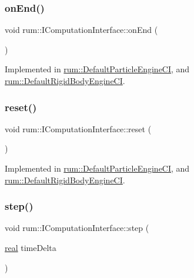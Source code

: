 \subsubsection{\texorpdfstring{on\+End()}{onEnd()}}
{\footnotesize\ttfamily void rum\+::\+I\+Computation\+Interface\+::on\+End (\begin{DoxyParamCaption}{ }\end{DoxyParamCaption})\hspace{0.3cm}{\ttfamily [pure virtual]}}



Implemented in \mbox{\hyperlink{classrum_1_1_default_particle_engine_c_i_ae478e3b581c3a6b306219c19552ff282}{rum\+::\+Default\+Particle\+Engine\+CI}}, and \mbox{\hyperlink{classrum_1_1_default_rigid_body_engine_c_i_aa1bc991031aab98d598f69c61fd3bc4c}{rum\+::\+Default\+Rigid\+Body\+Engine\+CI}}.

\mbox{\label{classrum_1_1_i_computation_interface_a9cff2ff492abd2a4f014aa4f25184c8b}} 
\subsubsection{\texorpdfstring{reset()}{reset()}}
{\footnotesize\ttfamily void rum\+::\+I\+Computation\+Interface\+::reset (\begin{DoxyParamCaption}{ }\end{DoxyParamCaption})\hspace{0.3cm}{\ttfamily [pure virtual]}}



Implemented in \mbox{\hyperlink{classrum_1_1_default_particle_engine_c_i_a826fdf25ee18128e2fd0944e7771b387}{rum\+::\+Default\+Particle\+Engine\+CI}}, and \mbox{\hyperlink{classrum_1_1_default_rigid_body_engine_c_i_aedfdb21689b6921afec2b9c607377335}{rum\+::\+Default\+Rigid\+Body\+Engine\+CI}}.

\mbox{\label{classrum_1_1_i_computation_interface_aa033d368ac4057a52077d6724b94d334}} 
\subsubsection{\texorpdfstring{step()}{step()}}
{\footnotesize\ttfamily void rum\+::\+I\+Computation\+Interface\+::step (\begin{DoxyParamCaption}\item[{\mbox{\hyperlink{namespacerum_a7e8cca23573d5eaead0f138cbaa4862c}{real}}}]{time\+Delta }\end{DoxyParamCaption})\hspace{0.3cm}{\ttfamily [pure virtual]}}



